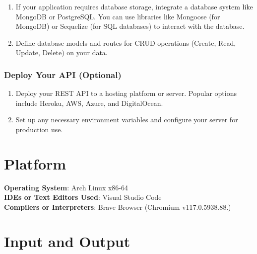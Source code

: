 \documentclass[11pt]{article}
\begin{document}
\begin{enumerate}
    \item If your application requires database storage, integrate a database system like MongoDB or PostgreSQL. You can use libraries like Mongoose (for MongoDB) or Sequelize (for SQL databases) to interact with the database.
    \item Define database models and routes for CRUD operations (Create, Read, Update, Delete) on your data.
\end{enumerate}

\subsubsection{Deploy Your API (Optional)}

\begin{enumerate}
    \item Deploy your REST API to a hosting platform or server. Popular options include Heroku, AWS, Azure, and DigitalOcean.
    \item Set up any necessary environment variables and configure your server for production use.
\end{enumerate}

\section{Platform}
\textbf{Operating System}: Arch Linux x86-64 \\
\textbf{IDEs or Text Editors Used}: Visual Studio Code\\
\textbf{Compilers or Interpreters}: Brave Browser (Chromium v117.0.5938.88.) \\

\section{Input and Output}
\end{document}
